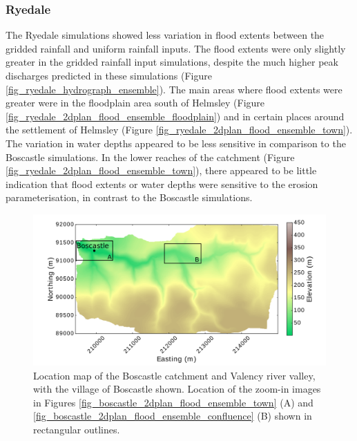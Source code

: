 \subsubsection{Ryedale}
The Ryedale simulations showed less variation in flood extents between the gridded rainfall and uniform rainfall inputs. The flood extents were only slightly greater in the gridded rainfall input simulations, despite the much higher peak discharges predicted in these simulations (Figure \ref{fig_ryedale_hydrograph_ensemble}). The main areas where flood extents were greater were in the floodplain area south of Helmsley (Figure \ref{fig_ryedale_2dplan_flood_ensemble_floodplain}) and in certain places around the settlement of Helmsley (Figure \ref{fig_ryedale_2dplan_flood_ensemble_town}).  The variation in water depths appeared to be less sensitive in comparison to the Boscastle simulations. In the lower reaches of the catchment (Figure \ref{fig_ryedale_2dplan_flood_ensemble_town}), there appeared to be little indication that flood extents or water depths were sensitive to the erosion parameterisation, in contrast to the Boscastle simulations.

\begin{figure}[!htbp]
\includegraphics[width=14cm]{chp_flood_figs_scripts/fig_boscastle_catchment_insets.png}
\caption{Location map of the Boscastle catchment and Valency river valley, with the village of Boscastle shown. Location of the zoom-in images in Figures \ref{fig_boscastle_2dplan_flood_ensemble_town} (A) and \ref{fig_boscastle_2dplan_flood_ensemble_confluence} (B) shown in rectangular outlines.}
\label{fig_boscastle_2dplan_inset_loc}
\end{figure}

